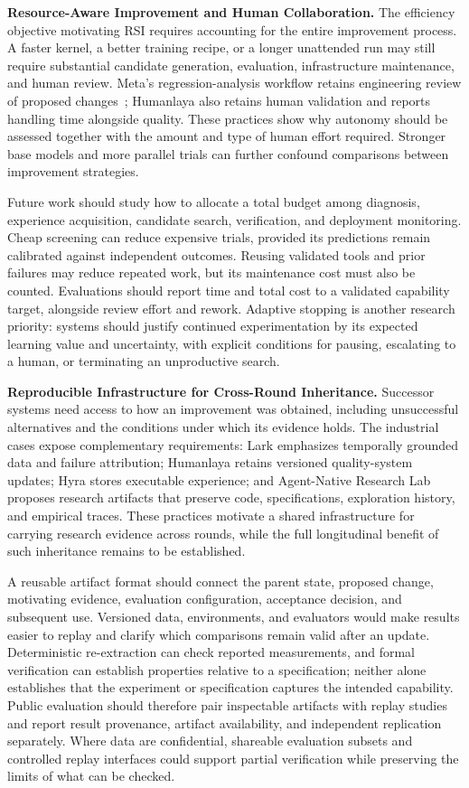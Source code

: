 \noindent\textbf{Resource-Aware Improvement and Human Collaboration.}
The efficiency objective motivating RSI requires accounting for the entire improvement process. A faster kernel, a better training recipe, or a longer unattended run may still require substantial candidate generation, evaluation, infrastructure maintenance, and human review. Meta's regression-analysis workflow retains engineering review of proposed changes~\cite{meta_capacity_efficiency_2026}; Humanlaya also retains human validation and reports handling time alongside quality. These practices show why autonomy should be assessed together with the amount and type of human effort required. Stronger base models and more parallel trials can further confound comparisons between improvement strategies.

Future work should study how to allocate a total budget among diagnosis, experience acquisition, candidate search, verification, and deployment monitoring. Cheap screening can reduce expensive trials, provided its predictions remain calibrated against independent outcomes. Reusing validated tools and prior failures may reduce repeated work, but its maintenance cost must also be counted. Evaluations should report time and total cost to a validated capability target, alongside review effort and rework. Adaptive stopping is another research priority: systems should justify continued experimentation by its expected learning value and uncertainty, with explicit conditions for pausing, escalating to a human, or terminating an unproductive search.

\noindent\textbf{Reproducible Infrastructure for Cross-Round Inheritance.}
Successor systems need access to how an improvement was obtained, including unsuccessful alternatives and the conditions under which its evidence holds. The industrial cases expose complementary requirements: Lark emphasizes temporally grounded data and failure attribution; Humanlaya retains versioned quality-system updates; Hyra stores executable experience; and Agent-Native Research Lab proposes research artifacts that preserve code, specifications, exploration history, and empirical traces. These practices motivate a shared infrastructure for carrying research evidence across rounds, while the full longitudinal benefit of such inheritance remains to be established.

A reusable artifact format should connect the parent state, proposed change, motivating evidence, evaluation configuration, acceptance decision, and subsequent use. Versioned data, environments, and evaluators would make results easier to replay and clarify which comparisons remain valid after an update. Deterministic re-extraction can check reported measurements, and formal verification can establish properties relative to a specification; neither alone establishes that the experiment or specification captures the intended capability. Public evaluation should therefore pair inspectable artifacts with replay studies and report result provenance, artifact availability, and independent replication separately. Where data are confidential, shareable evaluation subsets and controlled replay interfaces could support partial verification while preserving the limits of what can be checked.

